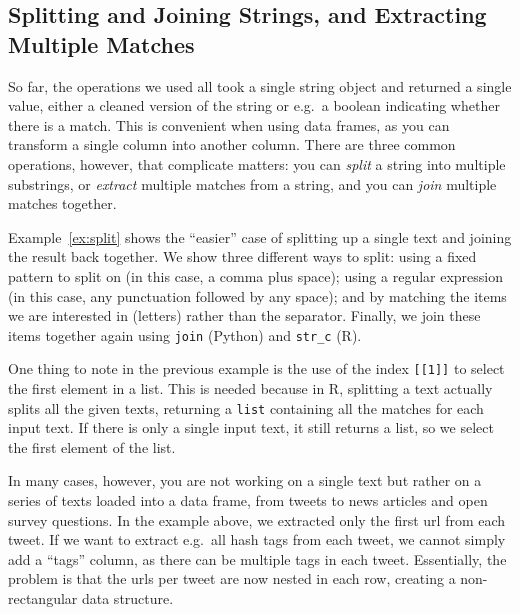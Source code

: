 
\subsection{Splitting and Joining Strings, and Extracting Multiple Matches}

So far, the operations we used all took a single string object and returned a single value,
either a cleaned version of the string or e.g.\ a boolean indicating whether there is a match.
This is convenient when using data frames, as you can transform a single column into another column.
There are three common operations, however, that complicate matters:
you can \emph{split} a string into multiple substrings, or \emph{extract} multiple matches from a string,
and you can \emph{join} multiple matches together.


Example~\ref{ex:split} shows the ``easier'' case of splitting up a single text and joining the result back together.
We show three different ways to split: using a fixed pattern to split on (in this case, a comma plus space);
using a regular expression (in this case, any punctuation followed by any space);
and by matching the items we are interested in (letters) rather than the separator.
Finally, we join these items together again using \texttt{join} (Python) and \texttt{str\_c} (R).

One thing to note in the previous example is the use of the index \verb|[[1]]| to select the first element in a list.
This is needed because in R, splitting a text actually splits all the given texts, returning a \texttt{list} containing all the matches for each input text.
If there is only a single input text, it still returns a list, so we select the first element of the list.

In many cases, however, you are not working on a single text but rather on a series of texts loaded into a data frame,
from tweets to news articles and open survey questions.
In the example above, we extracted only the first url from each tweet.
If we  want to extract e.g.\ all hash tags from each tweet, we cannot simply add a ``tags'' column,
as there can be multiple tags in each tweet.
Essentially, the problem is that the urls per tweet are now nested in each row,
creating a non-rectangular data structure.

